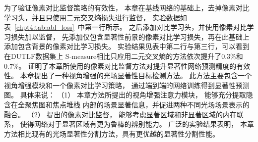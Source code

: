%
%
%
%
\indent
为了验证像素对比监督策略的有效性，
本章在基线网络的基础上，去掉像素对比学习头，并且只使用二元交叉熵损失进行监督，
实验数据如表~\ref{chpt4:tab:abl_loss}~中第一行所示。
之后添加对比学习头，并使用像素对比学习损失加以监督，
先添加仅包含显著性前景的像素对比学习损失，再在此基础上添加包含背景的像素对比学习损失。
实验结果见表中第二行与第三行，可以看到在DUTLF数据集上
S-measure相比只应用二元交叉熵的方法依次提升了0.3\%和0.7\%。
证明了本章所使用的像素对比监督方法对提升显著性网络预测精度的有效性。
%
%
%
%
本章提出了一种视角增强的光场显著性目标检测方法。
此方法主要包含一个视角增强模块和一个像素对比学习策略，
通过端到端的网络训练得到显著性预测图。
具体来说：
（1）
本章方法所提出的视角增强注意力模块，
能够充分提取隐含在全聚焦图和焦点堆栈
内部的场景显著信息，并促进两种不同光场场景表示的融合。
（2）
提出的像素对比监督，
能够考虑显著区域和非显著区域的内在联系，
使得网络对于显著区域有更为鲁棒的辨别能力。
广泛的实验结果表明，
本章方法相比现有的光场显著性分割方法，具有更优越的显著性分割性能。








